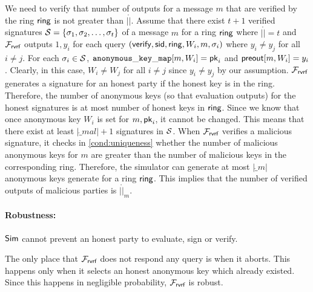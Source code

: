 We need to verify that number of outputs for a message $ m $ that are verified by the ring $ \mathsf{ring} $ is not greater than $ |\ring| $.
Assume that there exist $ t + 1 $ verified signatures $ {\mathcal{S}} = \{\sigma_1, \sigma_2, \ldots, \sigma_t\} $ of a message $ m $ for a ring $ \mathsf{ring} $ where $ |\ring| = t $ and $ \mathcal{F}_{\textsf{rvrf}} $ outputs $ 1, y_i $ for each query $ (\mathsf{verify}, \textsf{sid}, \mathsf{ring}, W_i, m, \sigma_i) $ where $ y_i \neq y_j $ for all $ i \neq j $. For each $ \sigma_i \in {\ensuremath{\mathcal{S}}} $, $ \mathtt{anonymous\_key\_map}[m,W_i] = \mathsf{pk}_i $ and $ {\mathsf{preout}}[m,W_i] = y_i $. Clearly, in this case, $ W_i \neq W_j $ for all $ i \neq j $ since $ y_i \neq y_j $ by our assumption. $ \mathcal{F}_{\textsf{rvrf}} $ generates a signature for an honest party if the honest key is in the ring. Therefore, the number of anonymous keys (so that evaluation outputs) for the honest signatures is at most number of honest keys in $ \mathsf{ring} $. Since we know that once anonymous key $ W_i $ is set for $ m, \mathsf{pk}_i $, it cannot be changed. This means that there exist at least $ |\ring_{mal}| + 1 $ signatures in $ {\mathcal{S}} $. When $ \mathcal{F}_{\textsf{rvrf}} $ verifies a malicious signature, it checks in \ref{cond:uniqueness} whether the number of malicious anonymous keys for $ m $ are greater than the number of malicious keys in the corresponding ring. Therefore, the simulator can generate at most $ |\ring_m| $ anonymous keys generate for a ring $ \mathsf{ring} $. This implies that the number of verified outputs of malicious parties   is $ |\ring|_m $. 

\paragraph{Robustness:} $ \mathsf{Sim} $ cannot prevent an honest party to evaluate, sign or verify.

The only place that $ \mathcal{F}_{\textsf{rvrf}} $ does not respond any query is when it aborts. This happens only when it selects an honest anonymous key which already existed. Since this happens in negligible probability,  $ \mathcal{F}_{\textsf{rvrf}} $ is robust.

